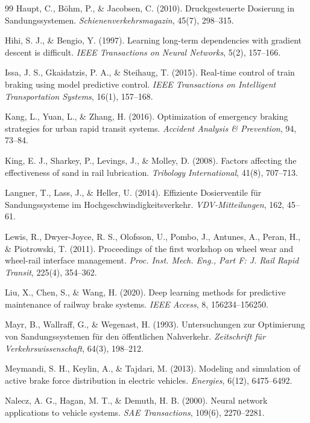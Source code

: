 \documentclass[a4paper,12pt]{article}
\theoremstyle{definition}
\theoremstyle{remark}
\begin{document}
\begin{thebibliography}{99}
 Haupt, C., Böhm, P., \& Jacobsen, C. (2010). Druckgesteuerte Dosierung in Sandungssystemen. \textit{Schienenverkehrsmagazin}, 45(7), 298--315.

 Hihi, S. J., \& Bengio, Y. (1997). Learning long-term dependencies with gradient descent is difficult. \textit{IEEE Transactions on Neural Networks}, 5(2), 157--166.

 Issa, J. S., Gkaidatzis, P. A., \& Steihaug, T. (2015). Real-time control of train braking using model predictive control. \textit{IEEE Transactions on Intelligent Transportation Systems}, 16(1), 157--168.

 Kang, L., Yuan, L., \& Zhang, H. (2016). Optimization of emergency braking strategies for urban rapid transit systems. \textit{Accident Analysis \& Prevention}, 94, 73--84.

 King, E. J., Sharkey, P., Levings, J., \& Molley, D. (2008). Factors affecting the effectiveness of sand in rail lubrication. \textit{Tribology International}, 41(8), 707--713.

 Langner, T., Lass, J., \& Heller, U. (2014). Effiziente Dosierventile für Sandungssysteme im Hochgeschwindigkeitsverkehr. \textit{VDV-Mitteilungen}, 162, 45--61.

 Lewis, R., Dwyer-Joyce, R. S., Olofsson, U., Pombo, J., Antunes, A., Peran, H., \& Piotrowski, T. (2011). Proceedings of the first workshop on wheel wear and wheel-rail interface management. \textit{Proc. Inst. Mech. Eng., Part F: J. Rail Rapid Transit}, 225(4), 354--362.

 Liu, X., Chen, S., \& Wang, H. (2020). Deep learning methods for predictive maintenance of railway brake systems. \textit{IEEE Access}, 8, 156234--156250.

 Mayr, B., Wallraff, G., \& Wegenast, H. (1993). Untersuchungen zur Optimierung von Sandungssystemen für den öffentlichen Nahverkehr. \textit{Zeitschrift für Verkehrswissenschaft}, 64(3), 198--212.

 Meymandi, S. H., Keylin, A., \& Tajdari, M. (2013). Modeling and simulation of active brake force distribution in electric vehicles. \textit{Energies}, 6(12), 6475--6492.

 Nalecz, A. G., Hagan, M. T., \& Demuth, H. B. (2000). Neural network applications to vehicle systems. \textit{SAE Transactions}, 109(6), 2270--2281.


\end{thebibliography}
\end{document}
